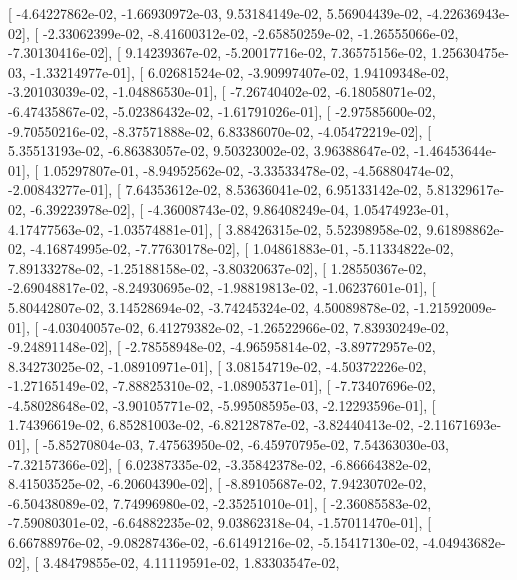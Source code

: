\documentclass{article}
\begin{document}
       [ -4.64227862e-02,  -1.66930972e-03,   9.53184149e-02,
          5.56904439e-02,  -4.22636943e-02],
       [ -2.33062399e-02,  -8.41600312e-02,  -2.65850259e-02,
         -1.26555066e-02,  -7.30130416e-02],
       [  9.14239367e-02,  -5.20017716e-02,   7.36575156e-02,
          1.25630475e-03,  -1.33214977e-01],
       [  6.02681524e-02,  -3.90997407e-02,   1.94109348e-02,
         -3.20103039e-02,  -1.04886530e-01],
       [ -7.26740402e-02,  -6.18058071e-02,  -6.47435867e-02,
         -5.02386432e-02,  -1.61791026e-01],
       [ -2.97585600e-02,  -9.70550216e-02,  -8.37571888e-02,
          6.83386070e-02,  -4.05472219e-02],
       [  5.35513193e-02,  -6.86383057e-02,   9.50323002e-02,
          3.96388647e-02,  -1.46453644e-01],
       [  1.05297807e-01,  -8.94952562e-02,  -3.33533478e-02,
         -4.56880474e-02,  -2.00843277e-01],
       [  7.64353612e-02,   8.53636041e-02,   6.95133142e-02,
          5.81329617e-02,  -6.39223978e-02],
       [ -4.36008743e-02,   9.86408249e-04,   1.05474923e-01,
          4.17477563e-02,  -1.03574881e-01],
       [  3.88426315e-02,   5.52398958e-02,   9.61898862e-02,
         -4.16874995e-02,  -7.77630178e-02],
       [  1.04861883e-01,  -5.11334822e-02,   7.89133278e-02,
         -1.25188158e-02,  -3.80320637e-02],
       [  1.28550367e-02,  -2.69048817e-02,  -8.24930695e-02,
         -1.98819813e-02,  -1.06237601e-01],
       [  5.80442807e-02,   3.14528694e-02,  -3.74245324e-02,
          4.50089878e-02,  -1.21592009e-01],
       [ -4.03040057e-02,   6.41279382e-02,  -1.26522966e-02,
          7.83930249e-02,  -9.24891148e-02],
       [ -2.78558948e-02,  -4.96595814e-02,  -3.89772957e-02,
          8.34273025e-02,  -1.08910971e-01],
       [  3.08154719e-02,  -4.50372226e-02,  -1.27165149e-02,
         -7.88825310e-02,  -1.08905371e-01],
       [ -7.73407696e-02,  -4.58028648e-02,  -3.90105771e-02,
         -5.99508595e-03,  -2.12293596e-01],
       [  1.74396619e-02,   6.85281003e-02,  -6.82128787e-02,
         -3.82440413e-02,  -2.11671693e-01],
       [ -5.85270804e-03,   7.47563950e-02,  -6.45970795e-02,
          7.54363030e-03,  -7.32157366e-02],
       [  6.02387335e-02,  -3.35842378e-02,  -6.86664382e-02,
          8.41503525e-02,  -6.20604390e-02],
       [ -8.89105687e-02,   7.94230702e-02,  -6.50438089e-02,
          7.74996980e-02,  -2.35251010e-01],
       [ -2.36085583e-02,  -7.59080301e-02,  -6.64882235e-02,
          9.03862318e-04,  -1.57011470e-01],
       [  6.66788976e-02,  -9.08287436e-02,  -6.61491216e-02,
         -5.15417130e-02,  -4.04943682e-02],
       [  3.48479855e-02,   4.11119591e-02,   1.83303547e-02,
\end{document}
